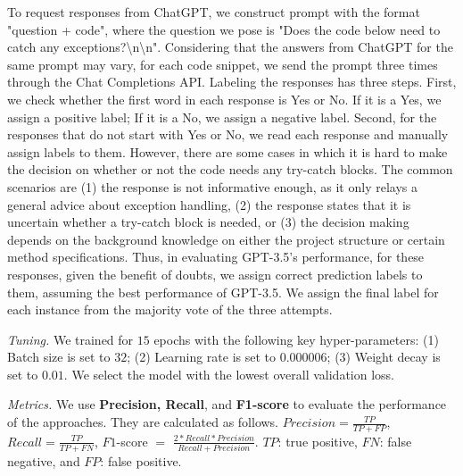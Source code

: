 To request responses from ChatGPT, we construct prompt with the format
"question + code", where the question we pose is "Does the code below
need to catch any exceptions?\textbackslash n\textbackslash n".
Considering that the answers from ChatGPT for the same prompt may
vary, for each code snippet, we send the prompt three times through
the Chat Completions API.
Labeling the responses has three steps. First, we check whether the
first word in each response is Yes or No. If it is a Yes, we assign a
positive label; If it is a No, we assign a negative label. Second, for
the responses that do not start with Yes or No, we read each response
and manually assign labels to them.  However, there are some cases in
which it is hard to make the decision on whether or not the code needs
any try-catch blocks. The common scenarios are (1) the response is not
informative enough, as it only relays a general advice about exception
handling, (2) the response states that it is uncertain whether a
try-catch block is needed, or (3) the decision making depends on the
background knowledge on either the project structure or certain method
specifications. Thus, in evaluating GPT-3.5's performance, for
these responses, given the benefit of doubts, we assign correct
prediction labels to them, assuming the best performance of GPT-3.5.
We assign the final label for each instance from the majority
vote of the three attempts.



{\em Tuning.} We trained {\tool} for $15$ epochs with the following key hyper-parameters: (1) Batch size is set to $32$; (2) Learning rate is set to $0.000006$; (3) Weight decay is set to $0.01$. We select the model with the lowest overall validation loss.


{\em Metrics.} We use \textbf{Precision, Recall}, and {\bf F1-score} to
evaluate the performance of the approaches. They are calculated as follows.
$Precision = \frac{TP}{TP+FP}$, $Recall = \frac{TP}{TP+FN}$, $F1$-score
$=$ $\frac{2*Recall*Precision}{Recall+Precision}$. $TP$: true
positive, $FN$: false negative, and $FP$: false positive.
